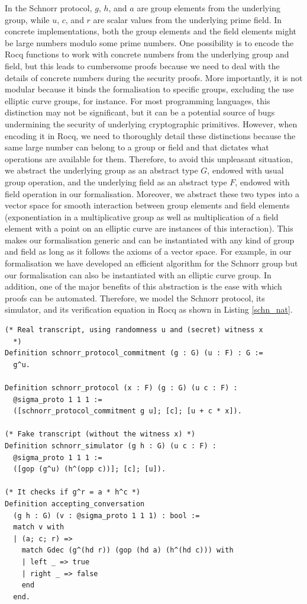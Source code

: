 \documentclass[sigconf,anonymous,review]{acmart}
\begin{document}
In the Schnorr protocol, $g$, $h$, and $a$ are group elements from the underlying group, while $u$, $c$, and $r$ are scalar values from the underlying prime field. In concrete implementations, both the group elements and the field elements might be large 
numbers modulo some prime numbers. 
One possibility is to encode the Rocq functions to work with concrete numbers from the underlying group and field, but this leads to cumbersome proofs because we need to deal with the details of concrete numbers during the security proofs. More importantly, it is not modular because it binds the formalisation to specific groups, excluding the use elliptic curve groups, for instance. For most programming languages, this distinction 
may not be significant, but it can be a potential source of bugs \cite{10.1007/978-3-662-63958-0_24} undermining the security of underlying cryptographic primitives. 
However, when encoding it in Rocq, we need to thoroughly detail these distinctions because 
the same large number can belong to a group or field and that dictates what operations are available for them. 
Therefore, to avoid this unpleasant situation,  
we abstract the underlying group as an abstract type $G$, endowed with 
usual group operation, and the underlying field as an abstract type $F$, endowed with 
field operation in our formalisation. 
Moreover, we abstract these two types into a vector space for smooth interaction between 
group elements and field elements (exponentiation in a multiplicative group as well as multiplication of a field element 
with a point on an elliptic curve are instances of this interaction). This 
makes our formalisation generic and can be instantiated with 
any kind of group and field as long as it follows the axioms of 
a vector space. For example, in our formalisation we have developed 
an efficient algorithm for the Schnorr group but our formalisation can 
also be instantiated with an elliptic curve group. In addition, 
one of the major benefits of this abstraction is the ease with which proofs 
can be automated. Therefore, we model the Schnorr 
protocol, its simulator, and its verification equation in Rocq as shown in 
Listing \ref{schn_nat}. 
\begin{lstlisting}[frame=single, language=Coq, caption={Schnorr protocol},
  label={schn_nat},captionpos=t, basicstyle=\ttfamily\footnotesize,
  abovecaptionskip=-\medskipamount]
(* Real transcript, using randomness u and (secret) witness x
  *)
Definition schnorr_protocol_commitment (g : G) (u : F) : G :=
  g^u. 

Definition schnorr_protocol (x : F) (g : G) (u c : F) : 
  @sigma_proto 1 1 1 :=  
  ([schnorr_protocol_commitment g u]; [c]; [u + c * x]).

(* Fake transcript (without the witness x) *)
Definition schnorr_simulator (g h : G) (u c : F) : 
  @sigma_proto 1 1 1 := 
  ([gop (g^u) (h^(opp c))]; [c]; [u]).

(* It checks if g^r = a * h^c *)
Definition accepting_conversation 
  (g h : G) (v : @sigma_proto 1 1 1) : bool :=
  match v with
  | (a; c; r) =>  
    match Gdec (g^(hd r)) (gop (hd a) (h^(hd c))) with 
    | left _ => true
    | right _ => false 
    end
  end.
\end{lstlisting}
  
\end{document}
